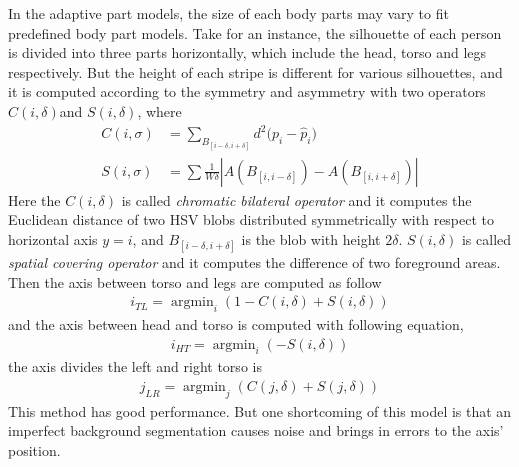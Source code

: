 In the adaptive part models, the size of each body parts may vary to fit predefined body part models. Take \cite{SDALF} for an instance, the silhouette of each person is divided into three parts horizontally, which include the head, torso and legs respectively. But the height of each stripe is different for various silhouettes, and it is computed according to the symmetry and asymmetry with two operators $C(i, \delta) $and $S(i,\delta)$, where 
\begin{equation}
\begin{aligned}
C(i,\sigma) & = \sum_{B_{[i-\delta, i+\delta]}}{d^2(p_i-{\hat{p}_i)}} \\
S(i,\sigma) &= \sum{\frac{1}{W\delta}|A(B_{[i,i-\delta]}) - A(B_{[i,i+\delta]})|}
\end{aligned}
\end{equation}
Here the $C(i, \delta)$ is called \emph{chromatic bilateral operator} and it computes the Euclidean distance of two HSV blobs distributed symmetrically with respect to horizontal axis $y = i$, and $B_{[i-\delta, i+\delta]}$ is the blob with height $2\delta$. $S(i,\delta)$ is called \emph{spatial covering operator} and it computes the difference of two foreground areas. Then the axis between torso and legs are computed as follow
\begin{equation}
\begin{aligned}
i_{TL} = \mathop{\arg\min}_i(1-C(i,\delta)+S(i,\delta))
\end{aligned}
\end{equation}
and the axis  between head and torso is computed with following equation,
\begin{equation}
\begin{aligned}
i_{HT} = \mathop{\arg\min}_i(-S(i,\delta))
\end{aligned}
\end{equation}
the axis divides the left and right torso is
\begin{equation}
\begin{aligned}
j_{LR} = \mathop{\arg\min}_j(C(j,\delta)+S(j,\delta))
\end{aligned}
\end{equation}
This method has good performance. But one shortcoming of this model is that an imperfect background segmentation causes noise and brings in errors to the axis' position. \\
